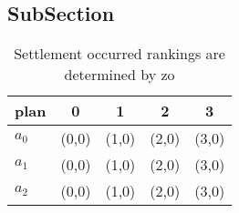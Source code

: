 \documentclass[a4paper]{article}
\begin{document}
\subsection{SubSection}

\begin{table}
\begin{adjustbox}{width=0.5\columnwidth}
\begin{tabular}{|l|l|l|l|l|}
\hline
\textbf{plan} & \multicolumn{1}{c|}{\textbf{0}} & \multicolumn{1}{c|}{\textbf{1}} & \multicolumn{1}{c|}{\textbf{2}} & \multicolumn{1}{c|}{\textbf{3}} \\ \hline
\textbf{$a_0$}  & (0,0) & (1,0) & (2,0) & (3,0) \\ \hline
\textbf{$a_1$}  & (0,0) & (1,0) & (2,0) & (3,0) \\ \hline
\textbf{$a_2$}  & (0,0) & (1,0) & (2,0) & (3,0) \\ \hline
\end{tabular}
\end{adjustbox}
\caption{Settlement occurred rankings are determined by zo
}
\end{table}
\end{document}
